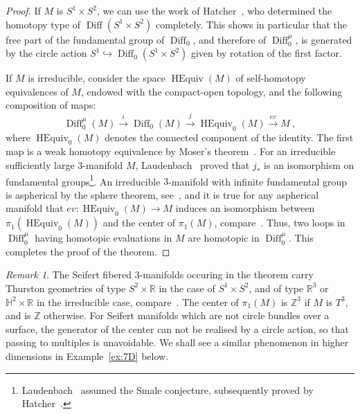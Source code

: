 \documentclass[12pt]{amsart}
\theoremstyle{definition}
\theoremstyle{remark}
\newtheorem{remark}[theorem]{Remark}
\def\bZ{{\mathbb Z}}
\def\bR{{\mathbb R}}
\def\bH{{\mathbb H}}
\newcommand\Diff{\operatorname{Diff}}
\newcommand\HEquiv{\operatorname{HEquiv}}
\begin{document}
\begin{proof}
    If $M$ is $S^{1}\times S^{2}$, we can use the work of Hatcher~\cite{H1,H2},
    who determined the homotopy type of $\Diff (S^{1}\times S^{2})$ completely. This shows in particular
    that the free part of the fundamental group of $\Diff_0$, and therefore of 
    $\Diff^{\mu}_0$, is generated by the circle action $S^1\hookrightarrow\Diff_0(S^{1}\times S^{2})$
    given by rotation of the first factor.
    
    If $M$ is irreducible, consider the space $\HEquiv (M)$ of self-homotopy equivalences 
    of $M$, endowed with the compact-open topology, and the following composition of 
    maps:
    $$
    \Diff^{\mu}_0(M)\stackrel{i}{\longrightarrow}\Diff_0(M)\stackrel{j}{\longrightarrow}\HEquiv_0(M)
    \stackrel{ev}{\longrightarrow} M \ ,
    $$ 
    where $\HEquiv_0(M)$ denotes the connected component of the identity. The first map is a 
    weak homotopy equivalence by Moser's theorem~\cite{Moser}. For an irreducible sufficiently 
    large $3$-manifold $M$, Laudenbach~\cite{L} proved that $j_*$ is an isomorphism on fundamental
    groups\footnote{Laudenbach~\cite{L} assumed the Smale conjecture, subsequently proved 
    by Hatcher~\cite{H2}.}. An irreducible $3$-manifold with infinite fundamental group is 
    aspherical by the sphere theorem, see~\cite{M}, and it is true for any aspherical manifold that 
    $ev\colon\HEquiv_0(M)\longrightarrow M$ induces an isomorphism between $\pi_1(\HEquiv_0(M))$ 
    and the center of $\pi_1(M)$, compare~\cite{G0}. Thus, two loops in $\Diff^{\mu}_0$ having 
    homotopic evaluations in $M$ are homotopic in $\Diff^{\mu}_0$. This completes the proof of the theorem.
    \end{proof}
\begin{remark}
The Seifert fibered $3$-manifolds occuring in the theorem carry Thurston geometries of type 
$S^{2}\times\bR$ in the case of $S^1\times S^2$, and of type $\bR^{3}$ or $\bH^{2}\times\bR$
in the irreducible case, compare~\cite{Scott}.  The center of $\pi_1(M)$ is $\bZ^3$ if $M$ is $T^3$,
and is $\bZ$ otherwise. For Seifert manifolds which are not circle bundles over a surface, the 
generator of the center can not be realised by a circle action, so that passing to multiples is 
unavoidable. We shall see a similar phenomenon in higher dimensions in Example~\ref{ex:7D} below.
\end{remark}
\end{document}
